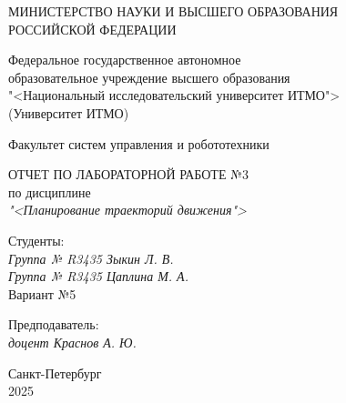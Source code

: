 \thispagestyle{empty}

\begin{center}
    МИНИСТЕРСТВО НАУКИ И ВЫСШЕГО ОБРАЗОВАНИЯ \\ РОССИЙСКОЙ ФЕДЕРАЦИИ

    \vspace{20pt}

    Федеральное государственное автономное \\ образовательное учреждение высшего образования \\
    "<Национальный исследовательский университет ИТМО"> \\
    (Университет ИТМО)

    \vspace{20pt}

    Факультет систем управления и робототехники
\end{center}

\vfill

\begin{center}
    ОТЧЕТ ПО ЛАБОРАТОРНОЙ РАБОТЕ №3\\  
    по дисциплине \\
    \textit{"<Планирование траекторий движения">}

    \vspace{20pt}

    
\end{center}

\vfill

    \noindent Студенты: \\
    \textit{Группа № R3435 \hfill Зыкин Л. В.} \\
    \textit{Группа № R3435 \hfill Цаплина М. А.} \\
    \noindent Вариант №5 \\

    \vspace{20pt}

    \noindent Предподаватель: \\
    \textit{доцент \hfill Краснов А. Ю.}

\vfill

\begin{center}
    Санкт-Петербург \\ 2025
\end{center}